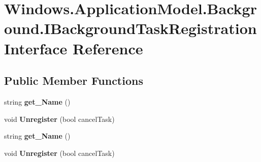 \hypertarget{interface_windows_1_1_application_model_1_1_background_1_1_i_background_task_registration}{}\section{Windows.\+Application\+Model.\+Background.\+I\+Background\+Task\+Registration Interface Reference}
\label{interface_windows_1_1_application_model_1_1_background_1_1_i_background_task_registration}
\subsection*{Public Member Functions}
\begin{DoxyCompactItemize}
\item 
\mbox{\label{interface_windows_1_1_application_model_1_1_background_1_1_i_background_task_registration_ad5142e1ef5565d5584ad51fb7bd89620}} 
string {\bfseries get\+\_\+\+Name} ()
\item 
\mbox{\label{interface_windows_1_1_application_model_1_1_background_1_1_i_background_task_registration_a32f3c4f5fe4a5c399e1eec1ae88de633}} 
void {\bfseries Unregister} (bool cancel\+Task)
\item 
\mbox{\label{interface_windows_1_1_application_model_1_1_background_1_1_i_background_task_registration_ad5142e1ef5565d5584ad51fb7bd89620}} 
string {\bfseries get\+\_\+\+Name} ()
\item 
\mbox{\label{interface_windows_1_1_application_model_1_1_background_1_1_i_background_task_registration_a32f3c4f5fe4a5c399e1eec1ae88de633}} 
void {\bfseries Unregister} (bool cancel\+Task)
\item 
\mbox{\label{interface_windows_1_1_application_model_1_1_background_1_1_i_background_task_registration_ad5142e1ef5565d5584ad51fb7bd89620}} 

\end{DoxyCompactItemize}

